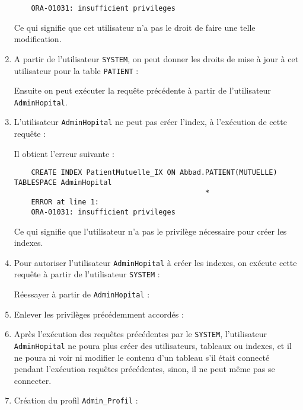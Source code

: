 \documentclass[12pt,a4paper]{article}
\begin{document}
\begin{enumerate}
\begin{verbatim}
	ORA-01031: insufficient privileges
	\end{verbatim}
	Ce qui signifie que cet utilisateur n'a pas le droit de faire une telle modification.
	\item A partir de l'utilisateur \texttt{SYSTEM}, on peut donner les droits de mise à jour à cet utilisateur
	pour la table \texttt{PATIENT} :
	
	Ensuite on peut exécuter la requête précédente à partir de l'utilisateur \texttt{AdminHopital}.
	
	\item L'utilisateur \texttt{AdminHopital} ne peut pas créer l'index, à l'exécution de cette requête :
	
	Il obtient l'erreur suivante :
	\begin{verbatim}
	CREATE INDEX PatientMutuelle_IX ON Abbad.PATIENT(MUTUELLE) TABLESPACE AdminHopital
	                                         *
	ERROR at line 1:
	ORA-01031: insufficient privileges
	\end{verbatim}
	Ce qui signifie que l'utilisateur n'a pas le privilège nécessaire pour créer les indexes.
	\item Pour autoriser l'utilisateur \texttt{AdminHopital} à créer les indexes, on exécute cette requête
	à partir de l'utilisateur \texttt{SYSTEM} :
	
	Réessayer à partir de \texttt{AdminHopital} :
	
	\item Enlever les privilèges précédemment accordés :
	
	\item Après l'exécution des requêtes précédentes par le \texttt{SYSTEM}, l'utilisateur \texttt{AdminHopital}
	ne poura plus créer des utilisateurs, tableaux ou indexes, et il ne poura ni voir ni modifier le contenu
	d'un tableau s'il était connecté pendant l'exécution requêtes précédentes, sinon, il ne peut même pas se connecter.
	\item Création du profil \texttt{Admin\_Profil} :
	
\end{enumerate}
\end{document}
